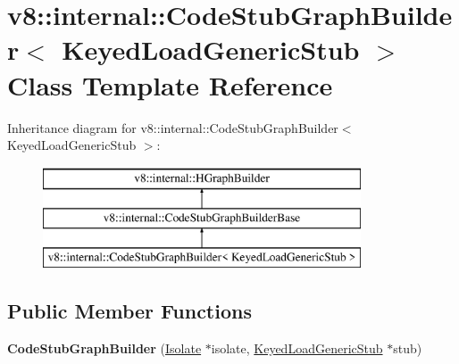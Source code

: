\hypertarget{classv8_1_1internal_1_1_code_stub_graph_builder_3_01_keyed_load_generic_stub_01_4}{}\section{v8\+:\+:internal\+:\+:Code\+Stub\+Graph\+Builder$<$ Keyed\+Load\+Generic\+Stub $>$ Class Template Reference}
\label{classv8_1_1internal_1_1_code_stub_graph_builder_3_01_keyed_load_generic_stub_01_4}
Inheritance diagram for v8\+:\+:internal\+:\+:Code\+Stub\+Graph\+Builder$<$ Keyed\+Load\+Generic\+Stub $>$\+:\begin{figure}[H]
\begin{center}
\leavevmode
\includegraphics[height=3.000000cm]{classv8_1_1internal_1_1_code_stub_graph_builder_3_01_keyed_load_generic_stub_01_4}
\end{center}
\end{figure}
\subsection*{Public Member Functions}
\begin{DoxyCompactItemize}
\item 
\hypertarget{classv8_1_1internal_1_1_code_stub_graph_builder_3_01_keyed_load_generic_stub_01_4_aba7bd668105758d97f8ed6629462f0c5}{}{\bfseries Code\+Stub\+Graph\+Builder} (\hyperlink{classv8_1_1internal_1_1_isolate}{Isolate} $\ast$isolate, \hyperlink{classv8_1_1internal_1_1_keyed_load_generic_stub}{Keyed\+Load\+Generic\+Stub} $\ast$stub)\label{classv8_1_1internal_1_1_code_stub_graph_builder_3_01_keyed_load_generic_stub_01_4_aba7bd668105758d97f8ed6629462f0c5}

\end{DoxyCompactItemize}
